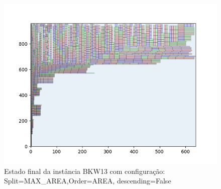 \begin{figure}[H]
    \centering
    \caption[]{Estado final da instância BKW13 com configuração: Split=MAX_AREA,Order=AREA, descending=False}
    \label{fig:bkw13-max_area-area-false}
    \includegraphics[scale=0.5]{output/figures/bkw/bkw13/max_area/area/false/0000}
\end{figure}